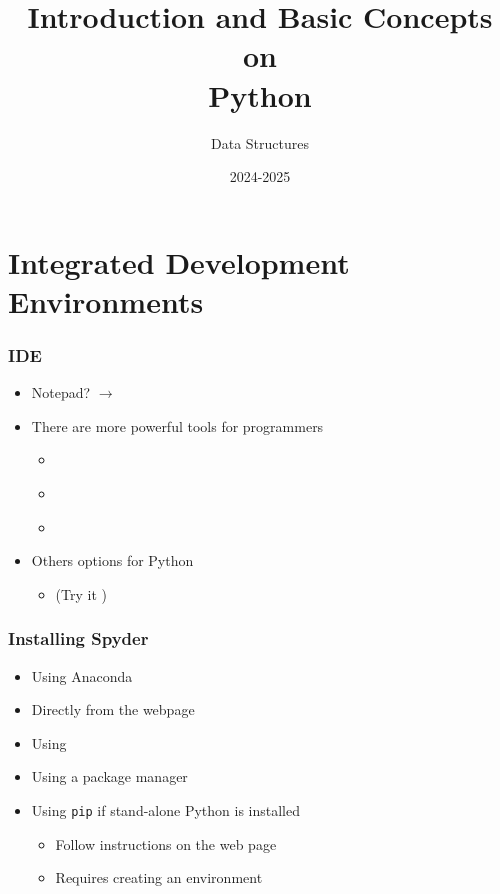 \documentclass[11pt]{beamer}
\author{Data Structures}
\title{\huge{Introduction and Basic Concepts on \\Python}}
\date[]{2024-2025}
\begin{document}
\begin{frame}[plain]
	\maketitle
\end{frame}

\begin{frame}
	\tableofcontents
\end{frame}

\section{Integrated Development Environments}

\begin{frame}\frametitle{IDE}
\begin{itemize}
\item Notepad? $\rightarrow$ \href{https://notepad-plus-plus.org/}{}
\item There are more powerful tools for programmers
    \begin{itemize}
    \item \href{https://docs.python.org/3/library/idle.html}{}
    \item \href{https://www.spyder-ide.org/}{}
    \item \href{https://www.jetbrains.com/pycharm/}{}
    \end{itemize}
\item Others options for Python
    \begin{itemize}
    \item \href{https://jupyter.org/install}{} (Try it \href{https://jupyter.org/try-jupyter/lab/?path=notebooks\%2FIntro.ipynb}{})
    \end{itemize}
\end{itemize}
\end{frame}

\begin{frame}\frametitle{Installing Spyder}
\begin{itemize}
\item Using Anaconda
\item Directly from the webpage
\item Using \href{https://winpython.github.io/}{}
\item Using a package manager
\item Using \lstinline|pip| if stand-alone Python is installed
    \begin{itemize}
        \item Follow instructions on the web page
        \item Requires creating an environment
    \end{itemize}
\end{itemize}
\end{frame}
\end{document}
